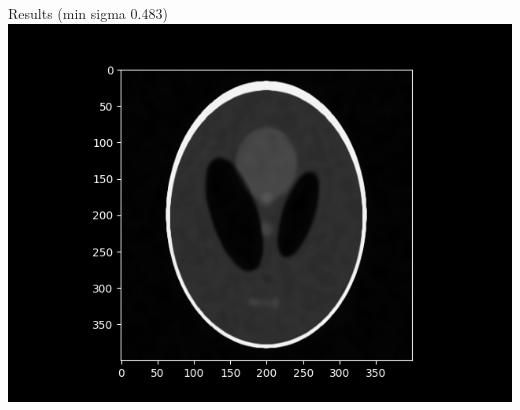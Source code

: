 \begin{frame}{Results (min sigma 0.483)}
\centering
\centering
\includegraphics[scale=0.6]{images/results/bm3d/bm3d_best.png}
\end{frame}

